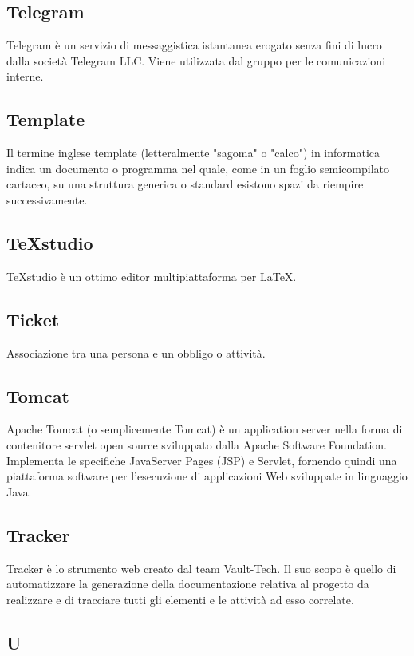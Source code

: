 \subsection*{Telegram}
Telegram è un servizio di messaggistica istantanea erogato senza fini di lucro dalla società Telegram LLC. Viene utilizzata dal gruppo per le comunicazioni interne.

\subsection*{Template}
Il termine inglese template (letteralmente "sagoma" o "calco") in informatica
indica un documento o programma nel quale, come in un foglio semicompilato
cartaceo, su una struttura generica o standard esistono spazi da riempire
successivamente.

\subsection*{TeXstudio}
TeXstudio è un ottimo editor multipiattaforma per LaTeX.

\subsection*{Ticket}
Associazione tra una persona e un obbligo o attività.

\subsection*{Tomcat}
Apache Tomcat (o semplicemente Tomcat) è un application server nella forma di contenitore servlet open source sviluppato dalla Apache Software Foundation. Implementa le specifiche JavaServer Pages (JSP) e Servlet, fornendo quindi una piattaforma software per l'esecuzione di applicazioni Web sviluppate in linguaggio Java. 

\subsection*{Tracker}
Tracker è lo strumento web creato dal team Vault-Tech. Il suo scopo è quello di automatizzare la generazione della documentazione relativa al progetto da realizzare e di tracciare tutti gli elementi e le attività ad esso correlate.

\newpage

\begin{center}
\Huge\section*{\uppercase{U}}
\end{center}

